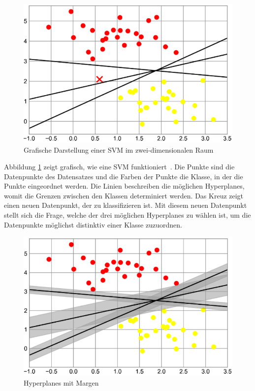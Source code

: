 \begin{figure}[h]
    \centering
    \includegraphics[scale=0.5]{figures/support_vector_new_point.png}
    \caption{Grafische Darstellung einer SVM im zwei-dimensionalen Raum}
    \label{fig:svm_graphic}
\end{figure}

Abbildung \ref{fig:svm_graphic} zeigt grafisch, wie eine SVM funktioniert~\cite[S. 437]{10.5555/3133359}. Die Punkte sind die Datenpunkte des Datensatzes und die Farben der Punkte die Klasse, in der die Punkte eingeordnet werden.
Die Linien beschreiben die möglichen Hyperplanes, womit die Grenzen zwischen den Klassen determiniert werden. Das Kreuz zeigt einen neuen Datenpunkt, der zu klassifizieren ist. Mit diesem neuen Datenpunkt stellt sich die Frage, welche der drei möglichen Hyperplanes zu wählen ist, um die Datenpunkte möglichst distinktiv einer Klasse zuzuordnen.

\pagebreak

\begin{figure}[h]
    \centering
    \includegraphics[scale=0.5]{figures/support_vector_maschine_margins.png}
    \caption{Hyperplanes mit Margen}
    \label{fig:svm_margins}
\end{figure}

